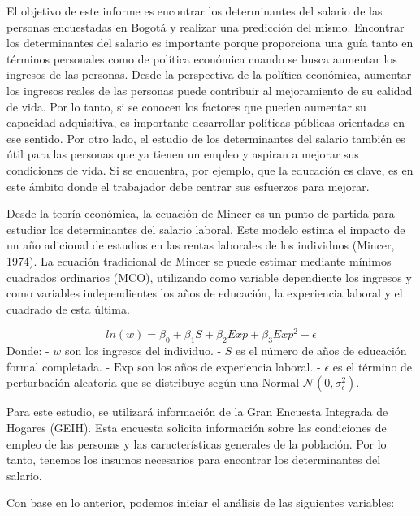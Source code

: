\documentclass[
]{article}
\begin{document}
El objetivo de este informe es encontrar los determinantes del salario
de las personas encuestadas en Bogotá y realizar una predicción del
mismo. Encontrar los determinantes del salario es importante porque
proporciona una guía tanto en términos personales como de política
económica cuando se busca aumentar los ingresos de las personas. Desde
la perspectiva de la política económica, aumentar los ingresos reales de
las personas puede contribuir al mejoramiento de su calidad de vida. Por
lo tanto, si se conocen los factores que pueden aumentar su capacidad
adquisitiva, es importante desarrollar políticas públicas orientadas en
ese sentido. Por otro lado, el estudio de los determinantes del salario
también es útil para las personas que ya tienen un empleo y aspiran a
mejorar sus condiciones de vida. Si se encuentra, por ejemplo, que la
educación es clave, es en este ámbito donde el trabajador debe centrar
sus esfuerzos para mejorar.

Desde la teoría económica, la ecuación de Mincer es un punto de partida
para estudiar los determinantes del salario laboral. Este modelo estima
el impacto de un año adicional de estudios en las rentas laborales de
los individuos (Mincer, 1974). La ecuación tradicional de Mincer se
puede estimar mediante mínimos cuadrados ordinarios (MCO), utilizando
como variable dependiente los ingresos y como variables independientes
los años de educación, la experiencia laboral y el cuadrado de esta
última.

\[ln(w) = \beta_{0} + \beta_{1}S + \beta_{2}Exp + \beta_{3}Exp^2 + \epsilon\]
Donde: - \(w\) son los ingresos del individuo. - \(S\) es el número de
años de educación formal completada. - \(\text{Exp}\) son los años de
experiencia laboral. - \(\epsilon\) es el término de perturbación
aleatoria que se distribuye según una Normal
\(\mathcal{N}(0, \sigma_{\epsilon}^2)\).

Para este estudio, se utilizará información de la Gran Encuesta
Integrada de Hogares (GEIH). Esta encuesta solicita información sobre
las condiciones de empleo de las personas y las características
generales de la población. Por lo tanto, tenemos los insumos necesarios
para encontrar los determinantes del salario.

Con base en lo anterior, podemos iniciar el análisis de las siguientes
variables:
\end{document}

